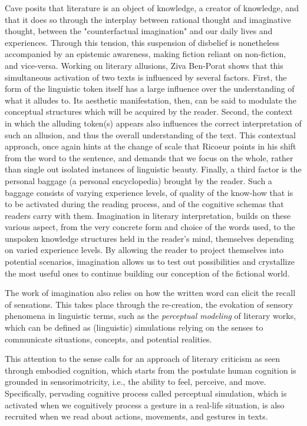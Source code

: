Cave posits that literature is an object of knowledge, a creator of knowledge, and that it does so through the interplay between rational thought and imaginative thought, between the "counterfactual imagination" and our daily lives and experiences. Through this tension, this suspension of disbelief is nonetheless accompanied by an epistemic awareness, making fiction reliant on non-fiction, and vice-versa. Working on literary allusions, Ziva Ben-Porat shows that this simultaneous activation of two texts is influenced by several factors. First, the form of the linguistic token itself has a large influence over the understanding of what it alludes to. Its aesthetic manifestation, then, can be said to modulate the conceptual structures which will be acquired by the reader. Second, the context in which the alluding token(s) appears also influences the correct interpretation of such an allusion, and thus the overall understanding of the text. This contextual approach, once again hints at the change of scale that Ricoeur points in his shift from the word to the sentence, and demands that we focus on the whole, rather than single out isolated instances of linguistic beauty. Finally, a third factor is the personal baggage (a personal encyclopedia) brought by the reader. Such a baggage consists of varying experience levels, of quality of the know-how that is to be activated during the reading process, and of the cognitive schemas that readers carry with them. Imagination in literary interpretation, builds on these various aspect, from the very concrete form and choice of the words used, to the unspoken knowledge structures held in the reader's mind, themselves depending on varied experience levels. By allowing the reader to project themselves into potential scenarios, imagination allows us to test out possibilities and crystallize the most useful ones to continue building our conception of the fictional world.

The work of imagination also relies on how the written word can elicit the recall of sensations. This takes place through the re-creation, the evokation of sensory phenomena in linguistic terms, such as the \emph{perceptual modeling} of literary works, which can be defined as (linguistic) simulations relying on the senses to communicate situations, concepts, and potential realities.

This attention to the sense calls for an approach of literary criticism as seen through embodied cognition, which starts from the postulate human cognition is grounded in sensorimotricity, i.e., the ability to feel, perceive, and move. Specifically, pervading cognitive process called perceptual simulation, which is activated when we cognitively process a gesture in a real-life situation, is also recruited when we read about actions, movements, and gestures in texts.

